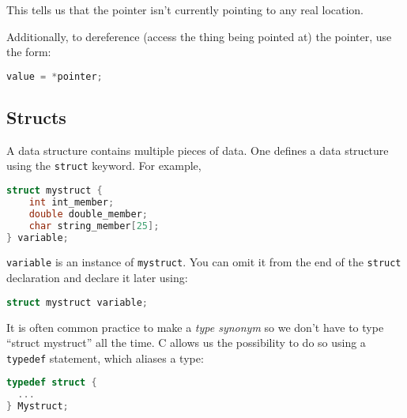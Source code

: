 This tells us that the pointer isn't currently pointing to any real location.

Additionally, to dereference (access the thing being pointed at) the pointer,
use the form:
\lstset{basicstyle=\scriptsize, numbers=left, captionpos=b, tabsize=4}
\begin{lstlisting}[caption=Section \thesection listing \arabic{comtypcnt},language={C},
breaklines=true,xleftmargin=15pt,label=lst:section\thesection listing\arabic{comtypcnt}]
value = *pointer;
\end{lstlisting}

\subsection{Structs}
A data structure contains multiple pieces of data.  One defines a data
structure using the \texttt{struct} keyword. For example,
\lstset{basicstyle=\scriptsize, numbers=left, captionpos=b, tabsize=4}
\begin{lstlisting}[caption=Section \thesection listing \arabic{comtypcnt},language={C},
breaklines=true,xleftmargin=15pt,label=lst:section\thesection listing\arabic{comtypcnt}]
struct mystruct {
    int int_member;
    double double_member;
    char string_member[25];
} variable;
\end{lstlisting}

\texttt{variable} is an instance of \texttt{mystruct}. You can omit it from the
end of the \texttt{struct} declaration and declare it later using:
\lstset{basicstyle=\scriptsize, numbers=left, captionpos=b, tabsize=4}
\begin{lstlisting}[caption=Section \thesection listing \arabic{comtypcnt},language={C},
breaklines=true,xleftmargin=15pt,label=lst:section\thesection listing\arabic{comtypcnt}]
struct mystruct variable;
\end{lstlisting}

It is often common practice to make a \emph{type synonym} so we don't have to
type ``struct mystruct'' all the time. C allows us the possibility to do so
using a \texttt{typedef} statement, which aliases a type:
\lstset{basicstyle=\scriptsize, numbers=left, captionpos=b, tabsize=4}
\begin{lstlisting}[caption=Section \thesection listing \arabic{comtypcnt},language={C},
breaklines=true,xleftmargin=15pt,label=lst:section\thesection listing\arabic{comtypcnt}]
typedef struct {
  ...
} Mystruct;
\end{lstlisting}

